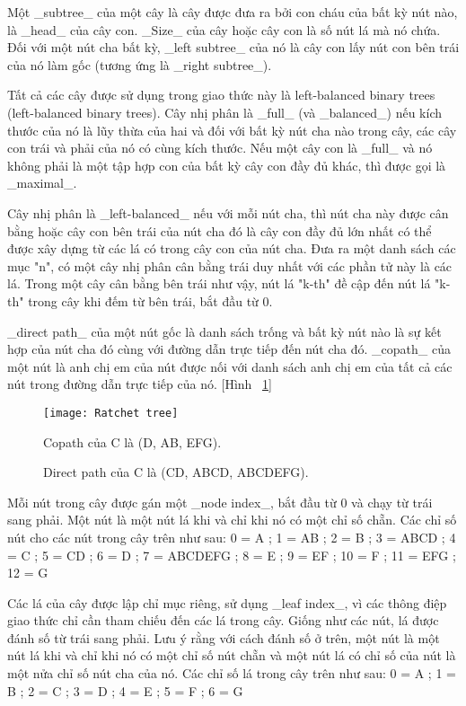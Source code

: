 \documentclass[../main-report.tex]{subfiles}
\begin{document}
Một \_subtree\_ của một cây là cây được đưa ra bởi con cháu của bất kỳ nút nào, là \_head\_ của cây con. \_Size\_ của cây hoặc cây con là số nút lá mà nó chứa. Đối với một nút cha bất kỳ, \_left subtree\_ của nó là cây con lấy nút con bên trái của nó làm gốc (tương ứng là \_right subtree\_).

Tất cả các cây được sử dụng trong giao thức này là \glsdesc{left-balanced binary trees} (\gls{left-balanced binary trees}). Cây nhị phân là \_full\_ (và \_balanced\_) nếu kích thước của nó là lũy thừa của hai và đối với bất kỳ nút cha nào trong cây, các cây con trái và phải của nó có cùng kích thước. Nếu một cây con là \_full\_  và nó không phải là một tập hợp con của bất kỳ cây con đầy đủ khác, thì được gọi là \_maximal\_. 

Cây nhị phân là \_left-balanced\_ nếu với mỗi nút cha, thì nút cha này được cân bằng hoặc cây con bên trái của nút cha đó là cây con đầy đủ lớn nhất có thể được xây dựng từ các lá có trong cây con của nút cha. Đưa ra một danh sách các mục "n", có một cây nhị phân cân bằng trái duy nhất với các phần tử này là các lá. Trong một cây cân bằng bên trái như vậy, nút lá "k-th" đề cập đến nút lá "k-th" trong cây khi đếm từ bên trái, bắt đầu từ 0.

\_direct path\_ của một nút gốc là danh sách trống và bất kỳ nút nào là sự kết hợp của nút cha đó cùng với đường dẫn trực tiếp đến nút cha đó. \_copath\_ của một nút là anh chị em của nút được nối với danh sách anh chị em của tất cả các nút trong đường dẫn trực tiếp của nó. [Hình ~\ref{fig:tree}]

\begin{figure}[!h]
\begin{center}
\label{fig:tree}
\texttt{[image: Ratchet tree]}
\caption{Direct path của C là (CD, ABCD, ABCDEFG).}

{Copath của C là (D, AB, EFG).}
\end{center}
\end{figure}

Mỗi nút trong cây được gán một \_node index\_, bắt đầu từ 0 và chạy từ trái sang phải. Một nút là một nút lá khi và chỉ khi nó có một chỉ số chẵn. Các chỉ số nút cho các nút trong cây trên như sau:
0 = A ; 1 = AB ; 2 = B ; 3 = ABCD ; 4 = C ; 5 = CD ; 6 = D ; 7 = ABCDEFG ; 8 = E ; 9 = EF ; 10 = F ; 11 = EFG ; 12 = G

Các lá của cây được lập chỉ mục riêng, sử dụng \_leaf index\_, vì các thông điệp giao thức chỉ cần tham chiếu đến các lá trong cây. Giống như các nút, lá được đánh số từ trái sang phải. Lưu ý rằng với cách đánh số ở trên, một nút là một nút lá khi và chỉ khi nó có một chỉ số nút chẵn và một nút lá có chỉ số của nút là một nửa chỉ số nút cha của nó. Các chỉ số lá trong cây trên như sau:
0 = A ; 1 = B ; 2 = C ; 3 = D ; 4 = E ; 5 = F ; 6 = G
\end{document}
